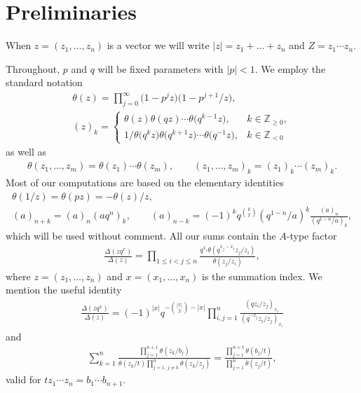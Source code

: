 \documentclass[11pt]{article}
\numberwithin{equation}{section}
\begin{document}
\section{Preliminaries}

When $z=(z_1,\dots,z_n)$ is a vector we will write $|z|=z_1+\dots+z_n$ and $Z=z_1\dotsm z_n$.

Throughout, $p$ and $q$ will be f\/ixed parameters with $|p|<1$. We employ the standard notation
\begin{gather*}\theta(z)=\prod\limits_{j=0}^\infty\big(1-p^jz\big)\big(1-p^{j+1}/z\big), \\
(z)_k=\begin{cases}\theta(z)\theta(qz)\dotsm\theta\big(q^{k-1}z\big), & k\in\mathbb Z_{\geq 0},\\
1/\theta\big(q^kz\big)\theta\big(q^{k+1}z\big)\dotsm\theta\big(q^{-1}z\big), & k\in\mathbb Z_{<0}\end{cases} \end{gather*}
as well as
\begin{gather*}\theta(z_1,\dots,z_m)=\theta(z_1)\dotsm\theta(z_m), \qquad (z_1,\dots,z_m)_k=(z_1)_k\dotsm(z_m)_k.\end{gather*}
Most of our computations are based on the elementary identities
\begin{gather*}\theta(1/z)=\theta(pz)=-\theta(z)/z, \\
(a)_{n+k}=(a)_n(aq^n)_k,\qquad (a)_{n-k}=(-1)^kq^{\binom k2}(q^{1-n}/a)^k\frac{(a)_n}{(q^{1-n}/a)_k}, \end{gather*}
which will be used without comment. All our sums contain the $A$-type factor
\begin{gather*}\frac{\Delta(zq^x)}{\Delta(z)}=\prod\limits_{1\leq i<j\leq n}\frac{q^{x_i}\theta(q^{x_j-x_i}z_j/z_i)}{\theta(z_j/z_i)}, \end{gather*}
where $z=(z_1,\dots,z_n)$ and $x=(x_1,\dots,x_n)$ is the summation index. We mention the useful identity \cite[equation~(3.8)]{r}
\begin{gather}\label{etf}
\frac{\Delta(z q^x)}{\Delta(z)}=(-1)^{|x|}q^{-\binom{|x|}2-|x|}\prod\limits_{i,j=1}^n\frac{(qz_i/z_j)_{x_i}}{(q^{-x_j}z_i/z_j)_{x_i}}
\end{gather}
and \cite[Example~20.53.3]{ww}
\begin{gather}\label{tpf}
\sum_{k=1}^n\frac{\prod\limits_{j=1}^{n+1}\theta(z_k/b_j)}{\theta(z_k/t)\prod\limits_{j=1,\, j\neq k}^n\theta(z_k/z_j)}=\frac{\prod\limits_{j=1}^{n+1}\theta(b_j/t)}{\prod\limits_{j=1}^n\theta(z_j/t)},
\end{gather}
valid for $tz_1\dotsm z_n=b_1\dotsm b_{n+1}$.
\end{document}

